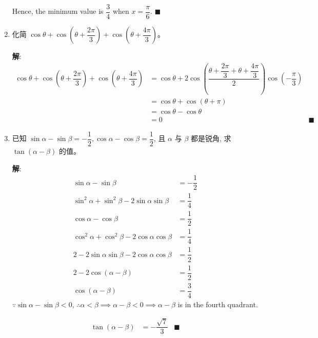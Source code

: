\documentclass{report}
\newcommand{\sol}{\vspace{0.2cm}\textbf{解}:}
\begin{document}
\begin{enumerate}[leftmargin=*]
    Hence, the minimum value is $\dfrac{3}{4}$ when $x = \dfrac{\pi}{6}$. \hfill $\blacksquare$

    \newpage
    \item 化简 $\cos \theta+\cos \left(\theta+\dfrac{2 \pi}{3}\right)+\cos \left(\theta+\dfrac{4 \pi}{3}\right)$。
    
    \sol{}
    \begin{align*}
        \cos \theta+\cos \left(\theta+\dfrac{2 \pi}{3}\right)+\cos \left(\theta+\dfrac{4 \pi}{3}\right) &= \cos \theta + 2\cos \left(\dfrac{\theta+\dfrac{2\pi}{3} + \theta + \dfrac{4\pi}{3}}{2}\right)\cos \left(-\dfrac{\pi}{3}\right) \\
        &= \cos \theta + \cos \left(\theta+\pi\right) \\
        &= \cos \theta - \cos \theta \\
        &= 0 &\blacksquare
    \end{align*}

    \item 已知 $\sin \alpha-\sin \beta=-\dfrac{1}{2}, \cos \alpha-\cos \beta=\dfrac{1}{2}$, 且 $\alpha$ 与 $\beta$ 都是锐角, 求 $\tan (\alpha-\beta)$ 的值。
    
    \sol{}
    \begin{align*}
        \sin \alpha-\sin \beta &= -\dfrac{1}{2}\\
        \sin^2 \alpha + \sin^2 \beta - 2\sin \alpha \sin \beta &= \dfrac{1}{4} \\
        \cos \alpha-\cos \beta &= \dfrac{1}{2} \\
        \cos^2 \alpha + \cos^2 \beta - 2\cos \alpha \cos \beta &= \dfrac{1}{4} \\
        2 - 2\sin \alpha \sin \beta - 2\cos \alpha \cos \beta &= \dfrac{1}{2} \\
        2 - 2\cos (\alpha - \beta) &= \dfrac{1}{2} \\
        \cos (\alpha - \beta) &= \dfrac{3}{4}
    \end{align*}
    $\because \sin\alpha - \sin\beta < 0$, $\therefore \alpha < \beta \implies \alpha - \beta < 0 \implies \alpha - \beta$ is in the fourth quadrant. \\
    \begin{center}
    \end{center}
    \begin{align*}
        \tan (\alpha - \beta) &= -\dfrac{\sqrt{7}}{3} &\blacksquare
    \end{align*}


\end{enumerate}
\end{document}
